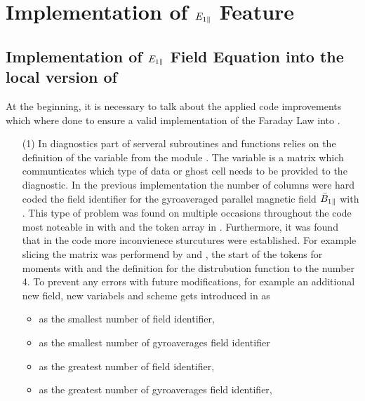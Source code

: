 \section{Implementation of $E_{1\parallel}$ Feature}
\label{sec:localSimulation}

\subsection{Implementation of $E_{1\parallel}$ Field Equation into the local version of \gkw}
\label{sub:implementationFieldEpar}

At the beginning, it is necessary to talk about the applied code improvements which where done to ensure a valid implementation of the Faraday Law into \gkw.
\begin{enumerate}
    \item[(1)] In diagnostics part of \gkw serveral subroutines and functions relies on the definition of the variable  from the module . The variable  is a matrix which communticates which type of data or ghost cell needs to be provided to the diagnostic. In the previous implementation the number of columns were hard coded the field identifier for the gyroaveraged parallel magnetic field $\bar{B}_{1\parallel}$ with . This type of problem was found on multiple occasions throughout the code most noteable in  with  and the token array in . Furthermore, it was found that in the code more inconvienece sturcutures were established. For example slicing the  matrix was performend by  and , the start of the tokens for moments with  and the definition for the distrubution function to the number 4. To prevent any errors with future modifications, for example an additional new field, new variabels and scheme gets introduced in  as
    \begin{itemize}
        \item {} as the smallest number of field identifier, 
        \item {} as the smallest number of gyroaverages field identifier
        \item {} as the greatest number of field identifier, 
        \item {} as the greatest number of gyroaverages field identifier,

\end{itemize}
\end{enumerate}

